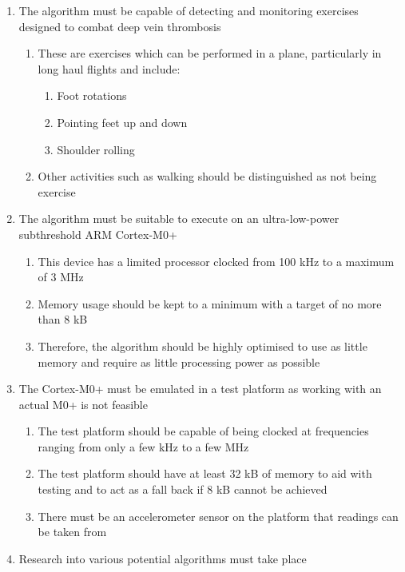 \begin{enumerate}
  \item The algorithm must be capable of detecting and monitoring exercises designed to combat deep vein thrombosis
  \begin{enumerate}[label*=\arabic*.]
    \item These are exercises which can be performed in a plane, particularly in long haul flights and include:
    \begin{enumerate}[label*=\arabic*.]
      \item Foot rotations
      \item Pointing feet up and down
      \item Shoulder rolling
    \end{enumerate}
    \item Other activities such as walking should be distinguished as not being exercise
  \end{enumerate}
  \item The algorithm must be suitable to execute on an ultra-low-power subthreshold ARM Cortex-M0+
  \begin{enumerate}[label*=\arabic*.]
    \item This device has a limited processor clocked from 100 kHz to a maximum of 3 MHz
    \item Memory usage should be kept to a minimum with a target of no more than 8 kB
    \item Therefore, the algorithm should be highly optimised to use as little memory and require as little processing power as possible
  \end{enumerate}
  \item The Cortex-M0+ must be emulated in a test platform as working with an actual M0+ is not feasible
  \begin{enumerate}[label*=\arabic*.]
    \item The test platform should be capable of being clocked at frequencies ranging from only a few kHz to a few MHz
    \item The test platform should have at least 32 kB of memory to aid with testing and to act as a fall back if 8 kB cannot be achieved
    \item There must be an accelerometer sensor on the platform that readings can be taken from
  \end{enumerate}
  \item Research into various potential algorithms must take place
  \begin{enumerate}[label*=\arabic*.]

\end{enumerate}
\end{enumerate}
